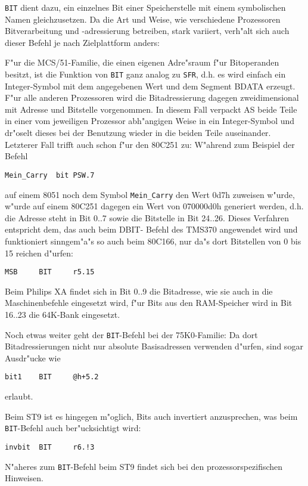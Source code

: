 \documentclass[12pt,a4paper,twoside]{report}
\newcommand{\tty}[1]{{\tt #1}}
\begin{document}
\tty{BIT} dient dazu, ein einzelnes Bit einer Speicherstelle mit einem
symbolischen Namen gleichzusetzen.  Da die Art und Weise, wie
verschiedene Prozessoren Bitverarbeitung und -adressierung betreiben,
stark variiert, verh"alt sich auch dieser Befehl je nach Zielplattform
anders:
\par
F"ur die MCS/51-Familie, die einen eigenen Adre"sraum f"ur Bitoperanden
besitzt, ist die Funktion von \tty{BIT} ganz analog zu \tty{SFR}, d.h.
es wird einfach ein Integer-Symbol mit dem angegebenen Wert und dem
Segment BDATA erzeugt.  F"ur alle anderen Prozessoren wird die
Bitadressierung dagegen zweidimensional mit Adresse und Bitstelle
vorgenommen.  In diesem Fall verpackt AS beide Teile in einer vom
jeweiligen Prozessor abh"angigen Weise in ein Integer-Symbol und dr"oselt
dieses bei der Benutzung wieder in die beiden Teile auseinander.
Letzterer Fall trifft auch schon f"ur den 80C251 zu:  W"ahrend zum Beispiel
der Befehl
\begin{verbatim}
Mein_Carry	bit	PSW.7
\end{verbatim}
auf einem 8051 noch dem Symbol \tty{Mein\_Carry} den Wert 0d7h zuweisen
w"urde, w"urde auf einem 80C251 dagegen ein Wert von 070000d0h generiert
werden, d.h. die Adresse steht in Bit  0..7 sowie die Bitstelle in Bit
24..26.  Dieses Verfahren entspricht dem, das auch beim DBIT-
Befehl des TMS370 angewendet wird und funktioniert sinngem"a"s so auch
beim 80C166, nur da"s dort Bitstellen von 0 bis 15 reichen d"urfen:
\begin{verbatim}
MSB     BIT     r5.15
\end{verbatim}
Beim Philips XA findet sich in Bit 0..9 die Bitadresse, wie sie auch
in die Maschinenbefehle eingesetzt wird, f"ur Bits aus den RAM-Speicher
wird in Bit 16..23 die 64K-Bank eingesetzt.
\par
Noch etwas weiter geht der \tty{BIT}-Befehl bei der 75K0-Familie: Da
dort Bitadressierungen nicht nur absolute Basisadressen verwenden
d"urfen, sind sogar Ausdr"ucke wie
\begin{verbatim}
bit1    BIT     @h+5.2
\end{verbatim}
erlaubt.
\par
Beim ST9 ist es hingegen m"oglich, Bits auch invertiert anzusprechen,
was beim \tty{BIT}-Befehl auch ber"ucksichtigt wird:
\begin{verbatim}
invbit  BIT     r6.!3
\end{verbatim}
N"aheres zum \tty{BIT}-Befehl beim ST9 findet sich bei den
prozessorspezifischen Hinweisen.
\end{document}
